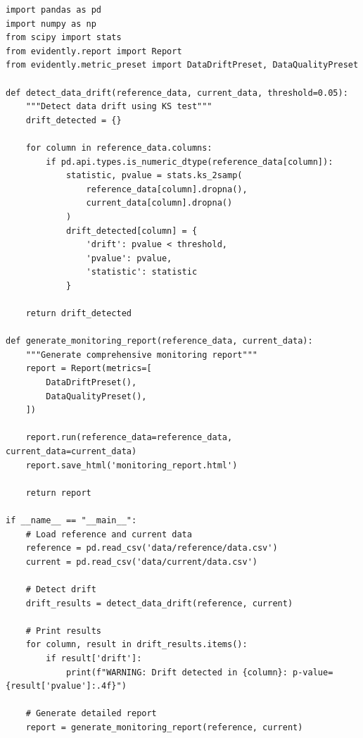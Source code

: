 \begin{lstlisting}[style=python, caption=monitor.py]
import pandas as pd
import numpy as np
from scipy import stats
from evidently.report import Report
from evidently.metric_preset import DataDriftPreset, DataQualityPreset

def detect_data_drift(reference_data, current_data, threshold=0.05):
    """Detect data drift using KS test"""
    drift_detected = {}

    for column in reference_data.columns:
        if pd.api.types.is_numeric_dtype(reference_data[column]):
            statistic, pvalue = stats.ks_2samp(
                reference_data[column].dropna(),
                current_data[column].dropna()
            )
            drift_detected[column] = {
                'drift': pvalue < threshold,
                'pvalue': pvalue,
                'statistic': statistic
            }

    return drift_detected

def generate_monitoring_report(reference_data, current_data):
    """Generate comprehensive monitoring report"""
    report = Report(metrics=[
        DataDriftPreset(),
        DataQualityPreset(),
    ])

    report.run(reference_data=reference_data, current_data=current_data)
    report.save_html('monitoring_report.html')

    return report

if __name__ == "__main__":
    # Load reference and current data
    reference = pd.read_csv('data/reference/data.csv')
    current = pd.read_csv('data/current/data.csv')

    # Detect drift
    drift_results = detect_data_drift(reference, current)

    # Print results
    for column, result in drift_results.items():
        if result['drift']:
            print(f"WARNING: Drift detected in {column}: p-value={result['pvalue']:.4f}")

    # Generate detailed report
    report = generate_monitoring_report(reference, current)
\end{lstlisting}

